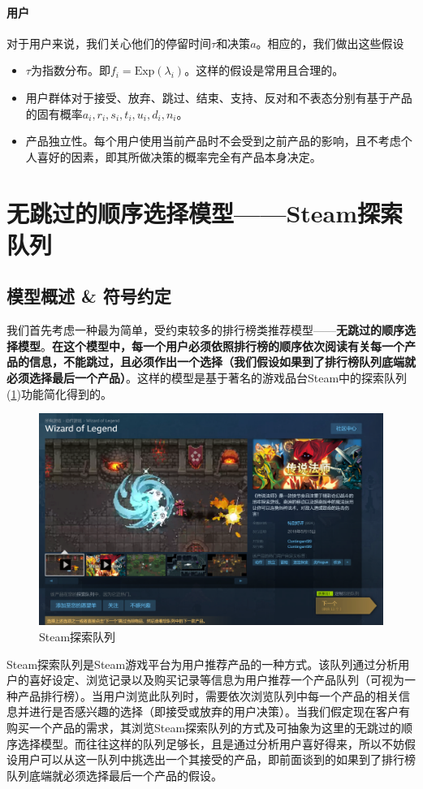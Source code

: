\documentclass[UTF8]{ctexart}
\theoremstyle{plain}
\theoremstyle{definition}
\theoremstyle{remark}
\begin{document}
	\paragraph{用户} 对于用户来说，我们关心他们的停留时间$\tau$和决策$a$。相应的，我们做出这些假设
	\begin{itemize}
		\item $\tau$为指数分布。即$f_i = \mathrm{Exp}(\lambda_i)$。这样的假设是常用且合理的。
		\item 用户群体对于接受、放弃、跳过、结束、支持、反对和不表态分别有基于产品的固有概率$a_i,r_i,s_i,t_i,u_i,d_i,n_i$。
		\item 产品独立性。每个用户使用当前产品时不会受到之前产品的影响，且不考虑个人喜好的因素，即其所做决策的概率完全有产品本身决定。
	\end{itemize}
	
	\section{无跳过的顺序选择模型——Steam探索队列}
	\subsection{模型概述 \& 符号约定}
	我们首先考虑一种最为简单，受约束较多的排行榜类推荐模型——\textbf{无跳过的顺序选择模型}。\textbf{在这个模型中，每一个用户必须依照排行榜的顺序依次阅读有关每一个产品的信息，不能跳过，且必须作出一个选择（我们假设如果到了排行榜队列底端就必须选择最后一个产品）}。这样的模型是基于著名的游戏品台Steam中的探索队列(\ref{modelA_fig_1})功能简化得到的。
	\begin{figure}[h!] 
		\centering
		\includegraphics[width = 12cm]{modelA_fig_1.png}
		\caption{Steam探索队列}\label{modelA_fig_1}
	\end{figure}
	Steam探索队列是Steam游戏平台为用户推荐产品的一种方式。该队列通过分析用户的喜好设定、浏览记录以及购买记录等信息为用户推荐一个产品队列（可视为一种产品排行榜）。当用户浏览此队列时，需要依次浏览队列中每一个产品的相关信息并进行是否感兴趣的选择（即接受或放弃的用户决策）。当我们假定现在客户有购买一个产品的需求，其浏览Steam探索队列的方式及可抽象为这里的无跳过的顺序选择模型。而往往这样的队列足够长，且是通过分析用户喜好得来，所以不妨假设用户可以从这一队列中挑选出一个其接受的产品，即前面谈到的如果到了排行榜队列底端就必须选择最后一个产品的假设。 \\
	
\end{document}
